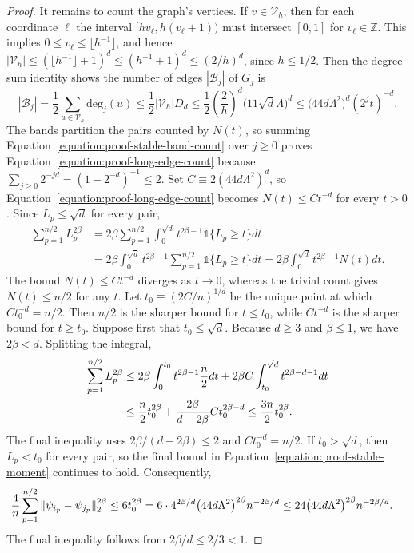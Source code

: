 \documentclass[10pt,a4paper]{amsart}
\newcommand{\one}{\mathds{1}}
\begin{document}
\begin{proof}
It remains to count the graph's vertices.
If $v\in\mathcal V_h$, then for each coordinate $\ell$ the interval $[hv_\ell,h(v_\ell+1))$ must intersect $[0,1]$ for $v_\ell \in \mathbb Z$.
This implies $0\leq v_\ell\leq\lfloor h^{-1}\rfloor$, and hence $|\mathcal V_h|\leq(\lfloor h^{-1}\rfloor+1)^d\leq(h^{-1}+1)^d\leq(2/h)^d$, since $h\leq1/2$.
Then the degree-sum identity shows the number of edges $|\mathcal B_j|$ of $G_j$ is
\begin{equation}\label{equation:proof-stable-band-count}
|\mathcal B_j|=\frac12\sum_{u\in\mathcal V_h}\mathrm{deg}_j(u)\leq\frac12|\mathcal V_h|D_d\leq\frac12\left(\frac2h\right)^d\bigl(11\sqrt d\Lambda\bigr)^d\leq\bigl(44d\Lambda^2\bigr)^d(2^jt)^{-d}.
\end{equation}
The bands partition the pairs counted by $N(t)$, so summing Equation~\eqref{equation:proof-stable-band-count} over $j\geq0$ proves Equation~\eqref{equation:proof-long-edge-count} because $\sum_{j\geq0}2^{-jd}=(1-2^{-d})^{-1}\leq2$.
Set $C\equiv2(44d\Lambda^2)^d$, so Equation~\eqref{equation:proof-long-edge-count} becomes $N(t)\leq Ct^{-d}$ for every $t>0$.
Since $L_p\leq\sqrt d$ for every pair,
\begin{align*}
\sum_{p=1}^{n/2}L_p^{2\beta}&=2\beta\sum_{p=1}^{n/2}\int_0^{\sqrt d}t^{2\beta-1}\one\{L_p\geq t\}dt\\
&=2\beta\int_0^{\sqrt d}t^{2\beta-1}\sum_{p=1}^{n/2}\one\{L_p\geq t\}dt=2\beta\int_0^{\sqrt d}t^{2\beta-1}N(t)dt.
\end{align*}
The bound $N(t) \le Ct^{-d}$ diverges as $t \to 0$, whereas the trivial count gives $N(t)\leq n/2$ for any $t$.
Let $t_0\equiv(2C/n)^{1/d}$ be the unique point at which $Ct_0^{-d}=n/2$.
Then $n/2$ is the sharper bound for $t\leq t_0$, while $Ct^{-d}$ is the sharper bound for $t\geq t_0$.
Suppose first that $t_0\leq\sqrt d$.
Because $d\geq3$ and $\beta\leq1$, we have $2\beta<d$.
Splitting the integral,
\begin{align}
\sum_{p=1}^{n/2}L_p^{2\beta}&\leq2\beta\int_0^{t_0}t^{2\beta-1}\frac n2dt+2\beta C\int_{t_0}^{\sqrt d}t^{2\beta-d-1}dt\notag\\
&\leq\frac n2t_0^{2\beta}+\frac{2\beta}{d-2\beta}Ct_0^{2\beta-d}\leq\frac{3n}{2}t_0^{2\beta}. \label{equation:proof-stable-moment}
\end{align}
The final inequality uses $2\beta/(d-2\beta)\leq2$ and $Ct_0^{-d}=n/2$.
If $t_0>\sqrt d$, then $L_p<t_0$ for every pair, so the final bound in Equation~\eqref{equation:proof-stable-moment} continues to hold.
Consequently,
\begin{align}
\frac{4}{n}\sum_{p=1}^{n/2}\|\psi_{i_p}-\psi_{j_p}\|_2^{2\beta}&\leq6t_0^{2\beta}=6\cdot4^{2\beta/d}\bigl(44d\Lambda^2\bigr)^{2\beta}n^{-2\beta/d}\leq24\bigl(44d\Lambda^2\bigr)^{2\beta}n^{-2\beta/d}. \notag
\end{align}
The final inequality follows from $2\beta/d\leq2/3<1$.
\end{proof}
\end{document}
